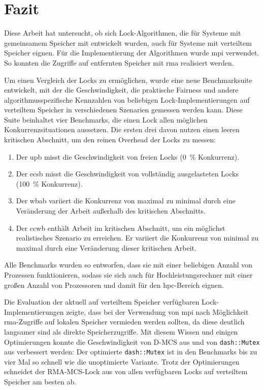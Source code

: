 \chapter{Fazit}
\label{ch:fazit}

Diese Arbeit hat untersucht,
ob sich Lock-Algorithmen,
die für Systeme mit gemeinsamem Speicher mit  entwickelt wurden,
auch für Systeme mit verteiltem Speicher eignen.
Für die Implementierung der Algorithmen wurde \gls{mpi} verwendet.
So konnten die Zugriffe auf entfernten Speicher mit \gls{rma} realisiert werden.

Um einen Vergleich der Locks zu ermöglichen,
wurde eine neue Benchmarksuite entwickelt,
mit der die Geschwindigkeit,
die praktische Fairness
und andere algorithmusspezifische Kennzahlen
von beliebigen Lock-Implementierungen auf verteiltem Speicher
in verschiedenen Szenarien gemessen werden kann.
Diese Suite beinhaltet vier Benchmarks,
die einen Lock allen möglichen Konkurrenzsituationen aussetzen.
Die ersten drei davon nutzen einen leeren kritischen Abschnitt,
um den reinen Overhead der Locks zu messen:
\begin{enumerate}
    \item Der \gls{upb} misst die Geschwindigkeit von freien Locks (0~\% Konkurrenz).
    \item Der \gls{ecsb} misst die Geschwindigkeit von vollständig ausgelasteten Locks (100~\% Konkurrenz).
    \item Der \gls{wbab} variiert die Konkurrenz von maximal zu minimal durch eine Veränderung
          der Arbeit außerhalb des kritischen Abschnitts.
    \item Der \gls{ccwb} enthält Arbeit im kritischen Abschnitt,
          um ein möglichst realistisches Szenario zu erreichen.
          Er variiert die Konkurrenz von minimal zu maximal
          durch eine Veränderung dieser kritischen Arbeit.
\end{enumerate}
Alle Benchmarks wurden so entworfen,
dass sie mit einer beliebigen Anzahl von Prozessen funktionieren,
sodass sie sich auch für Hochleistungsrechner mit einer großen Anzahl von Prozessoren
und damit für den \gls{hpc}-Bereich eignen.

Die Evaluation der aktuell auf verteiltem Speicher verfügbaren Lock-Implementierungen zeigte,
dass bei der Verwendung von \gls{mpi}
nach Möglichkeit \gls{rma}-Zugriffe auf lokalen Speicher vermieden werden sollten,
da diese deutlich langsamer sind
als direkte Speicherzugriffe.
Mit diesem Wissen und einigen Optimierungen
konnte die Geschwindigkeit von D-MCS aus \cite{RMA-RW}
und von \texttt{dash::Mutex} aus \cite{DART-MPI} verbessert werden:
Der optimierte \texttt{dash::Mutex} ist in den Benchmarks bis zu vier Mal so schnell
wie die unoptimierte Variante.
Trotz der Optimierungen schneidet der RMA-MCS-Lock aus \cite{RMA-RW} von allen verfügbaren Locks
auf verteiltem Speicher am besten ab.

